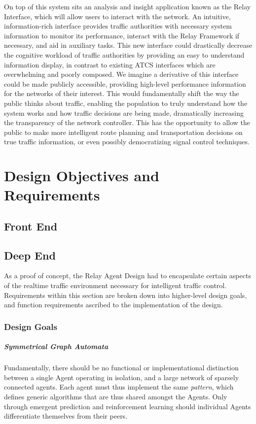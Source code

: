 \documentclass{report}
\begin{document}
On top of this system sits an analysis and insight application known as the Relay Interface, which will allow users to interact with the network.
An intuitive, information-rich interface provides traffic authorities with necessary system information to monitor its performance, interact with the Relay Framework if necessary, and aid in auxiliary tasks.
This new interface could drastically decrease the cognitive workload of traffic authorities by providing an easy to understand information display, in contrast to existing ATCS interfaces which are overwhelming and poorly composed.
We imagine a derivative of this interface could be made publicly accessible, providing high-level performance information for the networks of their interest.
This would fundamentally shift the way the public thinks about traffic, enabling the population to truly understand how the system works and how traffic decisions are being made, dramatically increasing the transparency of the network controller.
This has the opportunity to allow the public to make more intelligent route planning and transportation decisions on true traffic information, or even possibly democratizing signal control techniques.

\newpage
\chapter{Design Objectives and Requirements}
\section{Front End}


\section{Deep End}
\label{sec:deep:design_requirements}

As a proof of concept, the Relay Agent Design had to encapsulate certain aspects of the realtime traffic environment necessary for intelligent traffic control.
Requirements within this section are broken down into higher-level design goals, and function requirements ascribed to the implementation of the design.

\subsection{Design Goals}
\paragraph{Symmetrical Graph Automata}
Fundamentally, there should be no functional or implementational distinction between a single Agent operating in isolation, and a large network of sparsely connected agents.
Each agent must thus implement the same \emph{pattern}, which defines generic algorithms that are thus shared amongst the Agents.
Only through emergent prediction and reinforcement learning should individual Agents differentiate themselves from their peers.
\end{document}

